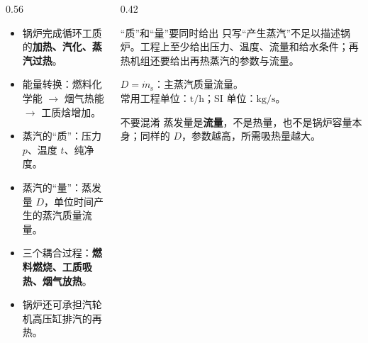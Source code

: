 \begin{frame}[t,shrink]{}
\begin{columns}[T,onlytextwidth]
\begin{column}{0.56\textwidth}
  \begin{itemize}
    \item 锅炉完成循环工质的\textbf{加热、汽化、蒸汽过热}。
    \item 能量转换：燃料化学能 $\rightarrow$ 烟气热能 $\rightarrow$ 工质焓增加。
    \item 蒸汽的“质”：压力 \(p\)、温度 \(t\)、纯净度。
    \item 蒸汽的“量”：蒸发量 \(D\)，单位时间产生的蒸汽质量流量。
    \item 三个耦合过程：\textbf{燃料燃烧、工质吸热、烟气放热}。
    \item 锅炉还可承担汽轮机高压缸排汽的再热。
  \end{itemize}
\end{column}
\begin{column}{0.42\textwidth}
  \begin{keybox}{“质”和“量”要同时给出}
  \small 只写“产生蒸汽”不足以描述锅炉。工程上至少给出压力、温度、流量和给水条件；再热机组还要给出再热蒸汽的参数与流量。
  \end{keybox}
  \vspace{0.8mm}
  \begin{plainbox}
  \small
  \(D=\dot m_{\mathrm{s}}\)：主蒸汽质量流量。\\
  常用工程单位：\(\mathrm{t/h}\)；SI 单位：\(\mathrm{kg/s}\)。
  \end{plainbox}
  \vspace{0.8mm}
  \begin{amberbox}{不要混淆}
  \small 蒸发量是\textbf{流量}，不是热量，也不是锅炉容量本身；同样的 \(D\)，参数越高，所需吸热量越大。
  \end{amberbox}
\end{column}
\end{columns}
\end{frame}

